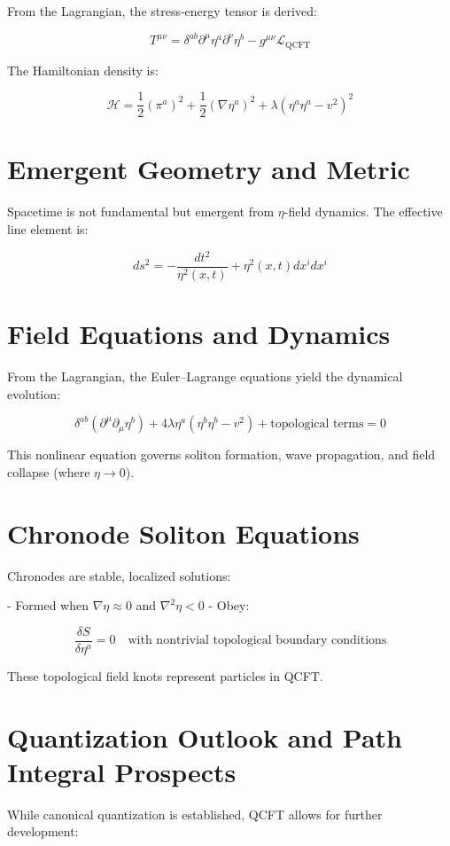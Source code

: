 \documentclass[12pt]{article}
\begin{document}
From the Lagrangian, the stress-energy tensor is derived:

\[
T^{\mu\nu} = \delta^{ab} \partial^\mu \eta^a \partial^\nu \eta^b - g^{\mu\nu} \mathcal{L}_{\text{QCFT}}
\]

The Hamiltonian density is:

\[
\mathcal{H} = \frac{1}{2} (\pi^a)^2 + \frac{1}{2} (\nabla \eta^a)^2 + \lambda(\eta^a \eta^a - v^2)^2
\]

\section{Emergent Geometry and Metric}

Spacetime is not fundamental but emergent from $\eta$-field dynamics. The effective line element is:

\[
ds^2 = -\frac{dt^2}{\eta^2(x,t)} + \eta^2(x,t) dx^i dx^i
\]

\section{Field Equations and Dynamics}

From the Lagrangian, the Euler–Lagrange equations yield the dynamical evolution:

\[
\delta^{ab} \left( \partial^\mu \partial_\mu \eta^b \right) + 4\lambda \eta^a (\eta^b \eta^b - v^2) + \text{topological terms} = 0
\]

This nonlinear equation governs soliton formation, wave propagation, and field collapse (where $\eta \to 0$).

\section{Chronode Soliton Equations}

Chronodes are stable, localized solutions:

- Formed when $\nabla \eta \approx 0$ and $\nabla^2 \eta < 0$
- Obey:

\[
\frac{\delta S}{\delta \eta^a} = 0 \quad \text{with nontrivial topological boundary conditions}
\]

These topological field knots represent particles in QCFT.

\section{Quantization Outlook and Path Integral Prospects}

While canonical quantization is established, QCFT allows for further development:
\end{document}
